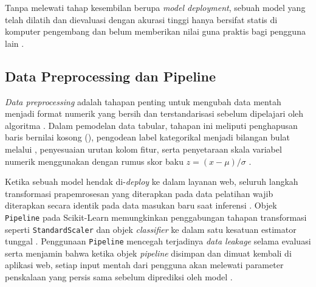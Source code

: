 \documentclass[a4paper,oneside,11pt]{book}
\begin{document}
\par Tanpa melewati tahap kesembilan berupa \textit{model deployment}, sebuah model yang telah dilatih dan dievaluasi dengan akurasi tinggi hanya bersifat statis di komputer pengembang dan belum memberikan nilai guna praktis bagi pengguna lain \cite{huyen2022designing, kreuzberger2023mlops}.

\subsection{Data Preprocessing dan Pipeline}
\par \textit{Data preprocessing} adalah tahapan penting untuk mengubah data mentah menjadi format numerik yang bersih dan terstandarisasi sebelum dipelajari oleh algoritma \cite{techtarget_preprocessing, trivusi_preprocessing}. Dalam pemodelan data tabular, tahapan ini meliputi penghapusan baris bernilai kosong (), pengodean label kategorikal menjadi bilangan bulat melalui , penyesuaian urutan kolom fitur, serta penyetaraan skala variabel numerik menggunakan  dengan rumus skor baku $z = (x - \mu) / \sigma$ \cite{pedregosa2011scikit, han2022data}.
\par Ketika sebuah model hendak di-\textit{deploy} ke dalam layanan web, seluruh langkah transformasi prapemrosesan yang diterapkan pada data pelatihan wajib diterapkan secara identik pada data masukan baru saat inferensi \cite{huyen2022designing, scikit_pipeline}. Objek \texttt{Pipeline} pada Scikit-Learn memungkinkan penggabungan tahapan transformasi seperti \texttt{StandardScaler} dan objek \textit{classifier} ke dalam satu kesatuan estimator tunggal \cite{scikit_pipeline}. Penggunaan \texttt{Pipeline} mencegah terjadinya \textit{data leakage} selama evaluasi serta menjamin bahwa ketika objek \textit{pipeline} disimpan dan dimuat kembali di aplikasi web, setiap input mentah dari pengguna akan melewati parameter penskalaan yang persis sama sebelum diprediksi oleh model \cite{scikit_pipeline, scikit_persistence}.
\end{document}
